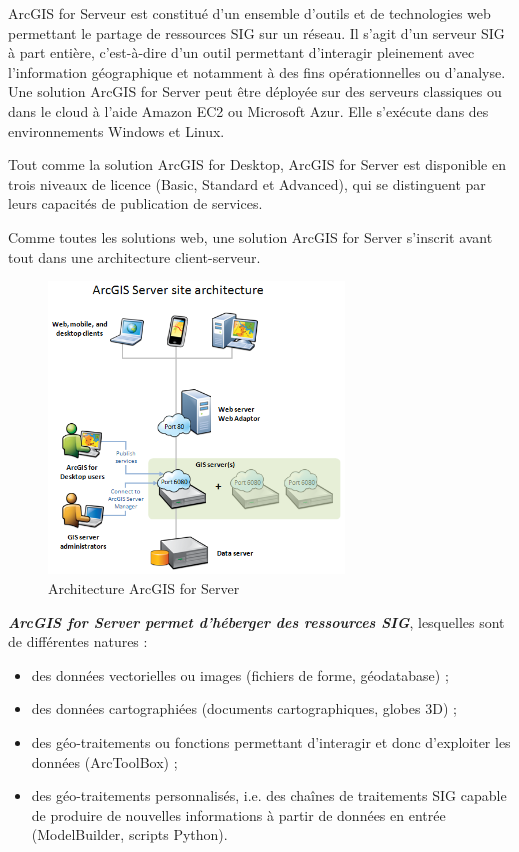 \documentclass[11pt]{article}
\begin{document}
ArcGIS for Serveur est constitué d'un ensemble d'outils et de technologies web permettant le partage de ressources SIG sur un réseau. Il s'agit d'un serveur SIG à part entière, c'est-à-dire d'un outil permettant d'interagir pleinement avec l'information géographique et notamment à des fins opérationnelles ou d'analyse. Une solution ArcGIS for Server peut être déployée sur des serveurs classiques ou dans le cloud à l'aide Amazon EC2 ou Microsoft Azur. Elle s'exécute dans des environnements Windows et Linux.

Tout comme la solution ArcGIS for Desktop, ArcGIS for Server est disponible en trois niveaux de licence (Basic, Standard et Advanced), qui se distinguent par leurs capacités de publication de services. 

Comme toutes les solutions web, une solution ArcGIS for Server s'inscrit avant tout dans une architecture client-serveur. 
\begin{figure}[H]
	\center \includegraphics[width=0.7\textwidth]{img/cours/AcrGIS_Server_architecture.png}
	\caption{Architecture ArcGIS for Server}
\end{figure}
\vspace{2em}

\textbf{\emph{ArcGIS for Server permet d'héberger des ressources SIG}}, lesquelles sont de différentes  natures : 
\begin{itemize}
	\item des données vectorielles ou images (fichiers de forme, géodatabase) ;
	\item des données cartographiées (documents cartographiques, globes 3D) ;
	\item des géo-traitements ou fonctions permettant d'interagir et donc d'exploiter les données (ArcToolBox) ;
	\item des géo-traitements personnalisés, i.e. des chaînes de traitements SIG capable de produire de nouvelles informations à partir de données en entrée (ModelBuilder, scripts Python).
\end{itemize}
\end{document}
